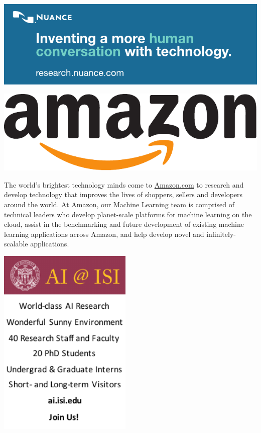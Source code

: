 \vfill{}


\begin{center}
\includegraphics[width=1\textwidth]{content/images-web/ads/nuance}
\par\end{center}

\clearpage{}

\begin{center}
\begin{minipage}[b][1\totalheight][t]{0.48\columnwidth}%
\begin{center}
\includegraphics[width=1\textwidth]{content/images-web/ads/amazon}
\par\end{center}

\large

The world's brightest technology minds come to \url{Amazon.com} to
research and develop technology that improves the lives of shoppers,
sellers and developers around the world. At Amazon, our Machine Learning
team is comprised of technical leaders who develop planet-scale platforms
for machine learning on the cloud, assist in the benchmarking and
future development of existing machine learning applications across
Amazon, and help develop novel and infinitely-scalable applications.%
\end{minipage}\hfill{}\includegraphics[width=0.48\textwidth]{content/images-web/ads/ai_at_isi}
\par\end{center}

